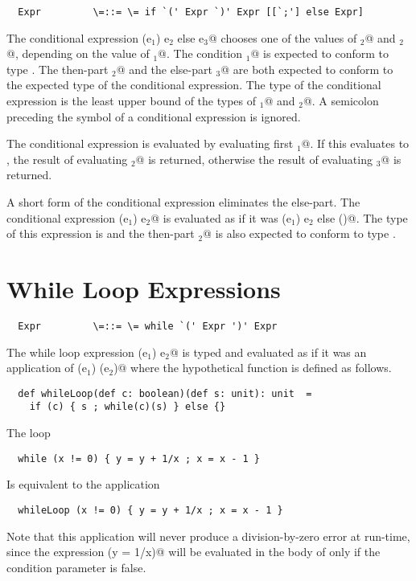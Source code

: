 \documentclass[11pt]{report}
\begin{document}
\syntax\begin{verbatim}
  Expr	       \=::= \= if `(' Expr `)' Expr [[`;'] else Expr]
\end{verbatim}

The conditional expression \verb@if (e$_1$) e$_2$ else e$_3$@ chooses
one of the values of \verb@e$_2$@ and \verb@e$_2$@, depending on the
value of \verb@e$_1$@. The condition \verb@e$_1$@ is expected to
conform to type \verb@boolean@.  The then-part \verb@e$_2$@ and the
else-part \verb@e$_3$@ are both expected to conform to the expected
type of the conditional expression. The type of the conditional
expression is the least upper bound of the types of \verb@e$_1$@ and
\verb@e$_2$@.  A semicolon preceding the \verb@else@ symbol of a
conditional expression is ignored.

The conditional expression is evaluated by evaluating first
\verb@e$_1$@. If this evaluates to \verb@true@, the result of
evaluating \verb@e$_2$@ is returned, otherwise the result of
evaluating \verb@e$_3$@ is returned.

A short form of the conditional expression eliminates the
else-part. The conditional expression \verb@if (e$_1$) e$_2$@ is
evaluated as if it was \verb@if (e$_1$) e$_2$ else ()@.  The type of
this expression is \verb@unit@ and the then-part
\verb@e$_2$@ is also expected to conform to type \verb@unit@.

\section{While Loop Expressions}

\syntax\begin{verbatim}
  Expr	       \=::= \= while `(' Expr ')' Expr
\end{verbatim}

The while loop expression \verb@while (e$_1$) e$_2$@ is typed and
evaluated as if it was an application of \verb@whileLoop (e$_1$) (e$_2$)@ where
the hypothetical function \verb@whileLoop@ is defined as follows.

\begin{verbatim}
  def whileLoop(def c: boolean)(def s: unit): unit  =
    if (c) { s ; while(c)(s) } else {}
\end{verbatim}

\example The loop 
\begin{verbatim}
  while (x != 0) { y = y + 1/x ; x = x - 1 }
\end{verbatim}
Is equivalent to the application
\begin{verbatim}
  whileLoop (x != 0) { y = y + 1/x ; x = x - 1 }
\end{verbatim}
Note that this application will never produce a division-by-zero 
error at run-time, since the
expression \verb@(y = 1/x)@ will be evaluated in the body of
\verb@while@ only if the condition parameter is false.
\end{document}
